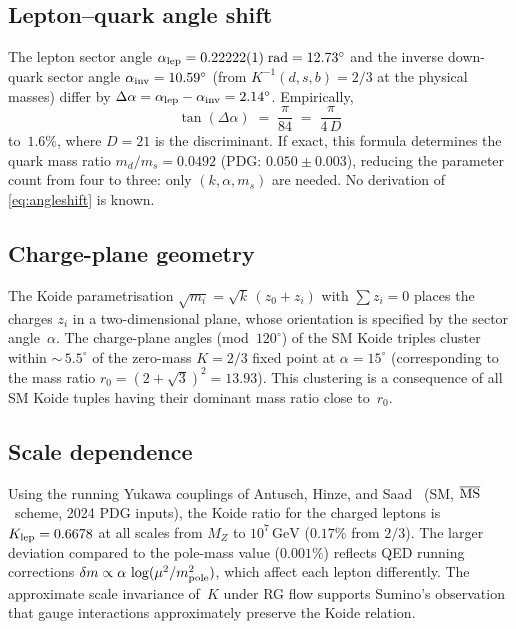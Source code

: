 \documentclass[12pt,a4paper]{article}
\newcommand{\GeV}{\,\mathrm{GeV}}
\begin{document}
\subsection{Lepton--quark angle shift}

The lepton sector angle $\alpha_{\rm lep} =
0.22222(1)\;\text{rad} = 12.73^\circ$ and the inverse down-quark sector
angle $\alpha_{\rm inv} = 10.59^\circ$ (from $K^{-1}(d,s,b) = 2/3$
at the physical masses) differ by $\Delta\alpha = \alpha_{\rm lep} -
\alpha_{\rm inv} = 2.14^\circ$. Empirically,
\begin{equation}
  \tan(\Delta\alpha) \;=\; \frac{\pi}{84}
  \;=\; \frac{\pi}{4\,D}
  \label{eq:angleshift}
\end{equation}
to~$1.6\%$, where $D = 21$ is the discriminant.  If exact,
this formula determines the quark mass ratio
$m_d/m_s = 0.0492$ (PDG: $0.050 \pm 0.003$), reducing the parameter
count from four to three: only $(k, \alpha, m_s)$ are needed.
No derivation of \eqref{eq:angleshift} is known.

\subsection{Charge-plane geometry}
\label{sec:chargeplane}

The Koide parametrisation $\sqrt{m_i} = \sqrt{k}\,(z_0 + z_i)$ with
$\sum z_i = 0$ places the charges $z_i$ in a two-dimensional plane,
whose orientation is specified by the sector angle~$\alpha$.
The charge-plane angles (mod~$120^\circ$) of the SM Koide triples
cluster within ${\sim}\,5.5^\circ$ of the zero-mass $K = 2/3$
fixed point at $\alpha = 15^\circ$ (corresponding to
the mass ratio $r_0 = (2+\sqrt{3})^2 = 13.93$).
This clustering is a consequence of all SM Koide tuples having
their dominant mass ratio close to~$r_0$.

\subsection{Scale dependence}
\label{sec:running}

Using the running Yukawa couplings of Antusch, Hinze, and
Saad~\cite{AntuschHinzeSaad:2025} (SM, $\overline{\rm MS}$~scheme,
2024 PDG inputs), the Koide ratio for the charged leptons is
$K_{\rm lep} = 0.6678$ at all scales from $M_Z$ to $10^7\GeV$
($0.17\%$ from $2/3$). The larger deviation compared to the pole-mass
value ($0.001\%$) reflects QED running corrections
$\delta m \propto \alpha\,\log(\mu^2/m_{\rm pole}^2)$, which affect
each lepton differently. The approximate scale invariance of~$K$ under
RG flow supports Sumino's
observation~\cite{Sumino:2009} that gauge interactions
approximately preserve the Koide relation.
\end{document}
